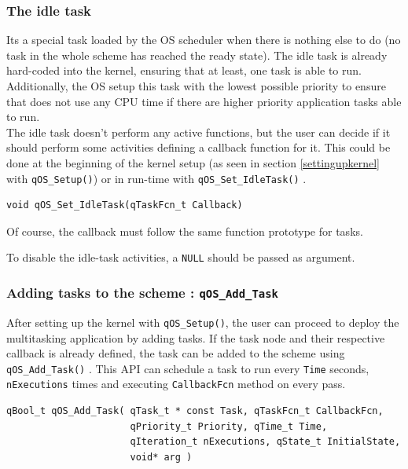 \documentclass{article}
\begin{document}
\subsubsection{The idle task}
Its a special task loaded by the OS scheduler when there is nothing else to do (no task in the whole scheme has reached the ready state). The idle task is already hard-coded into the kernel, ensuring that at least, one task is able to run. Additionally, the OS setup this task with the lowest possible priority to ensure that does not use any CPU time if there are higher priority application tasks able to run. \\
The idle task doesn't perform any active functions, but the user can decide if it should perform some activities defining a callback function for it. This could be done at the beginning of the kernel setup (as seen in section \ref{settingupkernel} with \lstinline{qOS_Setup()}) or in run-time with \lstinline{qOS_Set_IdleTask()} . \\

\begin{lstlisting}[style=CStyle]
void qOS_Set_IdleTask(qTaskFcn_t Callback)
\end{lstlisting}

Of course, the callback must follow the same function prototype for tasks. \\

\begin{tcolorbox}
\HandRight To disable the idle-task activities, a \lstinline{NULL} should be passed as argument.
\end{tcolorbox}

\subsubsection{Adding tasks to the scheme : \lstinline{qOS_Add_Task} } \label{addtask}
After setting up the kernel with \lstinline{qOS_Setup()}, the user can proceed to deploy the multitasking application by adding tasks. If the task node and their respective callback is already defined, the task can be added to the scheme using \lstinline{qOS_Add_Task()} . This API can schedule a task to run every \lstinline{Time} seconds, \lstinline{nExecutions} times and executing \lstinline{CallbackFcn} method on every pass.\\

\begin{lstlisting}[style=CStyle]
qBool_t qOS_Add_Task( qTask_t * const Task, qTaskFcn_t CallbackFcn, 
                      qPriority_t Priority, qTime_t Time, 
                      qIteration_t nExecutions, qState_t InitialState, 
                      void* arg )
\end{lstlisting}
\end{document}
